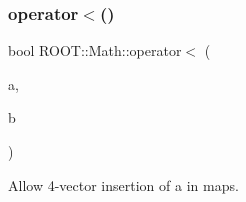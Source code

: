 \subsubsection{\texorpdfstring{operator$<$()}{operator<()}\hspace{0.1cm}{\footnotesize\ttfamily [3/3]}}
{\footnotesize\ttfamily bool R\+O\+O\+T\+::\+Math\+::operator$<$ (\begin{DoxyParamCaption}\item[{const Px\+Py\+Pz\+E\+Vector \&}]{a,  }\item[{const Px\+Py\+Pz\+E\+Vector \&}]{b }\end{DoxyParamCaption})}



Allow 4-\/vector insertion of a in maps. 

